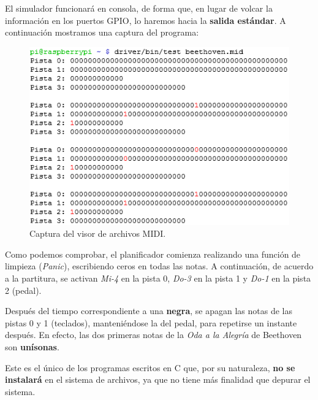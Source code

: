 \smallskip

El simulador funcionará en consola, de forma que, en lugar de volcar la información en los puertos \acrshort{GPIO}, lo haremos hacia la \textbf{salida estándar}. A continuación mostramos una captura del programa:

\smallskip

\begin{figure}[H]
	\noindent \begin{centering}
		\includegraphics[width=\linewidth*3/4]{capitulo5/cap_miditest}
		\par\end{centering}
	\smallskip
	\caption{\label{fig:cap_miditest} Captura del visor de archivos MIDI.}
\end{figure} 

\smallskip

Como podemos comprobar, el planificador comienza realizando una función de limpieza (\textit{Panic}), escribiendo ceros en todas las notas. A continuación, de acuerdo a la partitura, se activan \textit{Mi-4} en la pista 0, \textit{Do-3} en la pista 1 y \textit{Do-1} en la pista 2 (pedal).

Después del tiempo correspondiente a una \textbf{negra}, se apagan las notas de las pistas 0 y 1 (teclados), manteniéndose la del pedal, para repetirse un instante después. En efecto, las dos primeras notas de la \textit{Oda a la Alegría} de Beethoven son \textbf{unísonas}.

Este es el único de los programas escritos en C que, por su naturaleza, \textbf{no se instalará} en el sistema de archivos, ya que no tiene más finalidad que depurar el sistema.

